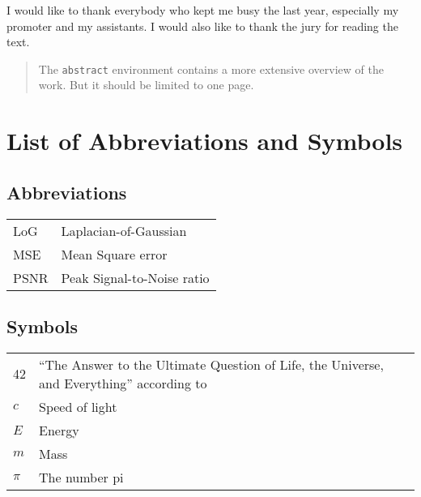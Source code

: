 \documentclass[master=eelt,masteroption=ec]{kulemt}
\begin{document}
\begin{preface}
  I would like to thank everybody who kept me busy the last year,
  especially my promoter and my assistants. I would also like to thank the
  jury for reading the text.
\end{preface}

\tableofcontents*

\begin{abstract}
  The \texttt{abstract} environment contains a more extensive overview of
  the work. But it should be limited to one page.

  \lipsum[1]
\end{abstract}

\listoffiguresandtables
\chapter{List of Abbreviations and Symbols}
\section*{Abbreviations}
\begin{flushleft}
  \renewcommand{\arraystretch}{1.1}
  \begin{tabularx}{\textwidth}{@{}p{12mm}X@{}}
    LoG   & Laplacian-of-Gaussian \\
    MSE   & Mean Square error \\
    PSNR  & Peak Signal-to-Noise ratio \\
  \end{tabularx}
\end{flushleft}
\section*{Symbols}
\begin{flushleft}
  \renewcommand{\arraystretch}{1.1}
  \begin{tabularx}{\textwidth}{@{}p{12mm}X@{}}
    42    & ``The Answer to the Ultimate Question of Life, the Universe,
            and Everything'' according to \cite{h2g2} \\
    $c$   & Speed of light \\
    $E$   & Energy \\
    $m$   & Mass \\
    $\pi$ & The number pi \\
  \end{tabularx}
\end{flushleft}
\end{document}
